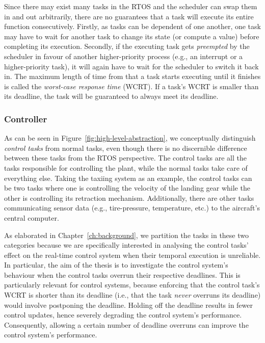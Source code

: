 Since there may exist many tasks in the RTOS and the scheduler can swap them in and out arbitrarily, there are no guarantees that a task will execute its entire function consecutively.
Firstly, as tasks can be dependent of one another, one task may have to wait for another task to change its state (or compute a value) before completing its execution.
Secondly, if the executing task gets \emph{preempted} by the scheduler in favour of another higher-priority process (e.g., an interrupt or a higher-priority task), it will again have to wait for the scheduler to switch it back in.
The maximum length of time from that a task starts executing until it finishes is called the \emph{worst-case response time} (WCRT).
If a task's WCRT is smaller than its deadline, the task will be guaranteed to always meet its deadline.

\subsubsection{Controller}%
%
As can be seen in Figure~\ref{fig:high-level-abstraction}, we conceptually distinguish \emph{control tasks} from normal tasks, even though there is no discernible difference between these tasks from the RTOS perspective.
The control tasks are all the tasks responsible for controlling the plant, while the normal tasks take care of everything else.
Taking the taxiing system as an example, the control tasks can be two tasks where one is controlling the velocity of the landing gear while the other is controlling its retraction mechanism.
Additionally, there are other tasks communicating sensor data (e.g., tire-pressure, temperature, etc.) to the aircraft's central computer.

As elaborated in Chapter~\ref{ch:background}, we partition the tasks in these two categories because we are specifically interested in analysing the control tasks' effect on the real-time control system when their temporal execution is unreliable.
In particular, the aim of the thesis is to investigate the control system's behaviour when the control tasks overrun their respective deadlines.
This is particularly relevant for control systems, because enforcing that the control task's WCRT is shorter than its deadline (i.e., that the task \emph{never} overruns its deadline) would involve postponing the deadline.
Holding off the deadline results in fewer control updates, hence severely degrading the control system's performance.
Consequently, allowing a certain number of deadline overruns can improve the control system's performance.

